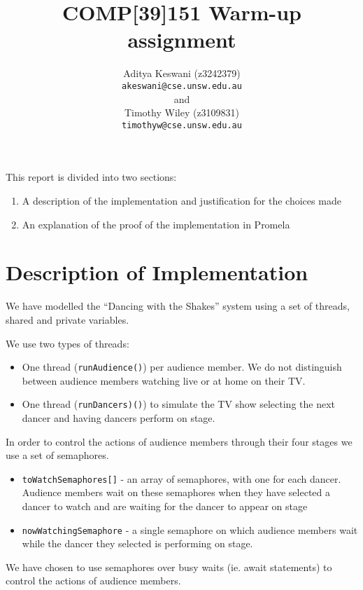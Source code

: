 \documentclass[12pt,a4paper]{scrartcl}
\begin{document}
\title{COMP[39]151 Warm-up assignment}
\author{Aditya Keswani (z3242379) \\ 
        \texttt{akeswani@cse.unsw.edu.au} \\ 
        and \\ 
        Timothy Wiley (z3109831) \\
        \texttt{timothyw@cse.unsw.edu.au} }

\maketitle

This report is divided into two sections:
\begin{enumerate}
    \item A description of the implementation and justification for the choices made
    \item An explanation of the proof of the implementation in Promela
\end{enumerate}

\section{Description of Implementation}
We have modelled the ``Dancing with the Shakes'' system using a set of threads, shared and private variables.

We use two types of threads:
\begin{itemize}
    \item One thread (\texttt{runAudience()}) per audience member. We do not distinguish between audience members watching live or at home on their TV.
    \item One thread (\texttt{runDancers)()}) to simulate the TV show selecting the next dancer and having dancers perform on stage.
\end{itemize}

In order to control the actions of audience members through their four stages we use a set of semaphores.
\begin{itemize}
    \item \texttt{toWatchSemaphores[]} - an array of semaphores, with one for each dancer.
          Audience members wait on these semaphores when they have selected a dancer to watch and are waiting for the dancer to appear on stage
    \item \texttt{nowWatchingSemaphore} - a single semaphore on which audience members wait while the dancer they selected is performing on stage.
\end{itemize}
We have chosen to use semaphores over busy waits (ie. await statements) to control the actions of audience members.
\end{document}
